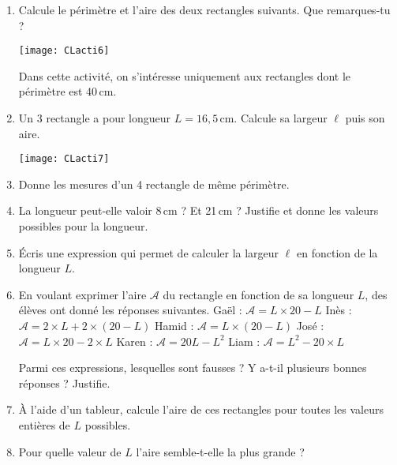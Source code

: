 \begin{activite}

\begin{enumerate}
\item Calcule le périmètre et l'aire des deux rectangles suivants. Que remarques-tu ?

\begin{center}
    \texttt{[image: CLacti6]}
\end{center}

Dans cette activité, on s'intéresse uniquement aux rectangles dont le périmètre est 40\,cm.

\item Un 3 rectangle a pour longueur $L = 16,5$\,cm. Calcule sa largeur $\ell$ puis son aire. 

\begin{center}
    \texttt{[image: CLacti7]}
\end{center}

\item Donne les mesures d'un 4 rectangle de même périmètre.
\item La longueur peut-elle valoir 8\,cm ? Et 21\,cm ? Justifie et donne les valeurs possibles pour la longueur.
\item Écris une expression qui permet de calculer la largeur $\ell$ en fonction de la longueur $L$. 
\item En voulant exprimer l'aire $\mathcal{A}$ du rectangle en fonction de sa longueur $L$, des élèves ont donné les réponses suivantes.
    \subitem Gaël	: $\mathcal{A} = L \times 20 - L$
	\subitem Inès	: $\mathcal{A} = 2 \times L + 2 \times (20 - L)$
	\subitem Hamid	: $\mathcal{A} = L \times (20 - L)$
	\subitem José	: $\mathcal{A} = L \times 20 - 2 \times L$
	\subitem Karen	: $\mathcal{A} = 20 L - L^2$
	\subitem Liam	: $\mathcal{A} = L^2 - 20 \times L$

Parmi ces expressions, lesquelles sont fausses ? Y a-t-il plusieurs bonnes réponses ? Justifie.

\item À l'aide d'un tableur, calcule l'aire de ces rectangles pour toutes les valeurs entières de $L$ possibles. 
\item Pour quelle valeur de $L$ l'aire semble-t-elle la plus grande ?
\end{enumerate}
\end{activite}

 



                                          


